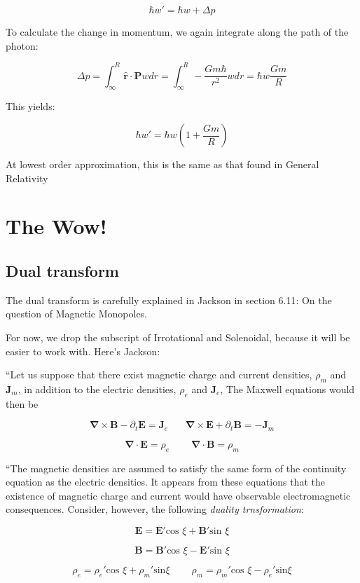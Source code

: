 \documentclass {article}
\renewcommand\vec{\mathbf}
\let\OldS\nabla
\renewcommand{\nabla}{\boldsymbol{\OldS}}
\let\OldHat\hat
\renewcommand{\hat}[1]{\OldHat{\mathbf{#1}}}
\begin{document}
$$\hbar w' = \hbar w + \Delta p $$

To calculate the change in momentum, we again integrate along the path of the photon:

$$\Delta p = \int_{\infty}^R \hat r \cdot \vec P w dr= \int_{\infty}^R - \frac {Gm\hbar}{r^2} w dr = \hbar w \frac {Gm}R $$

This yields:

$$\hbar w' = \hbar w \left( 1 + \frac {Gm}R \right) $$

At lowest order approximation, this is the same as that found in General Relativity

\newpage

\section{The Wow!}
\subsection{Dual transform}

The dual transform is carefully explained in Jackson in section 6.11: On the question of Magnetic Monopoles.

For now, we drop the subscript of Irrotational and Solenoidal, because it will be easier to work with. Here's Jackson:

``Let us suppose that there exist magnetic charge and current densities, $\rho_m$ and $\vec J_m$, in addition  to the electric densities, $\rho_e$ and $\vec J_e$, The Maxwell equations would then be

$$\nabla \times \vec B  - \partial_t \vec E  = \vec J_e  ~~~~~~~~ \nabla \times \vec E + \partial_t \vec B =  - \vec J_m   $$

$$\nabla \cdot \vec E = \rho_e ~~~~~~~~~~ \nabla \cdot \vec B =  \rho_m $$

``The magnetic densities are assumed to satisfy the same form of the continuity equation as the electric densities. It appears from these equations that the existence of magnetic charge and current would have observable electromagnetic consequences. Consider, however, the following \textit{duality trnsformation}:

$$\vec E = \vec E' \text{cos } \xi + \vec B'  \text{sin } \xi$$

$$\vec B = \vec B' \text{cos } \xi - \vec E'  \text{sin } \xi$$

$$\rho_e = \rho_e'  \text{cos } \xi  + \rho_m'  \text{sin} \xi  ~~~~~~~~~~ \rho_m = \rho_m'  \text{cos } \xi  - \rho_e'  \text{sin} \xi $$
\end{document}
